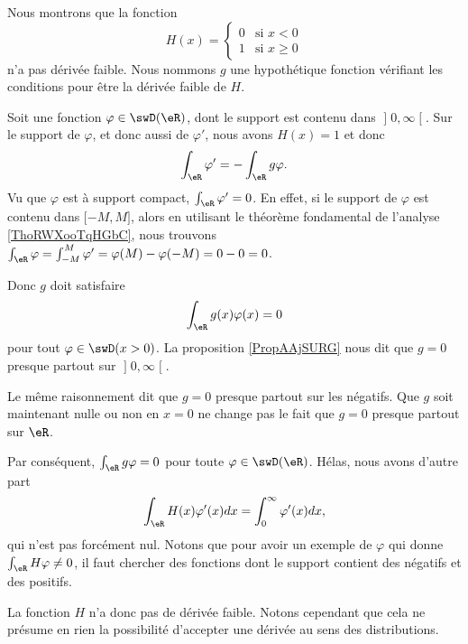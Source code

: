 \begin{example}     \label{EXooRVGHooTWOCtF}
	Nous montrons que la fonction
	\begin{equation}
		H(x)=\begin{cases}
			0 & \text{si } x<0     \\
			1 & \text{si } x\geq 0
		\end{cases}
	\end{equation}
	n'a pas dérivée faible. Nous nommons \( g\) une hypothétique fonction vérifiant les conditions pour être la dérivée faible de \( H\).

	Soit une fonction \( \varphi\in\swD(\eR)\), dont le support est contenu dans \( \mathopen] 0 , \infty \mathclose[\). Sur le support de \( \varphi\), et donc aussi de \( \varphi'\), nous avons \( H(x)=1\) et donc
		\begin{equation}
			\int_{\eR}\varphi'=-\int_{\eR}g\varphi.
		\end{equation}
		Vu que \( \varphi\) est à support compact, \( \int_{\eR}\varphi'=0\). En effet, si le support de \( \varphi\) est contenu dans \( \mathopen[ -M , M \mathclose]\), alors en utilisant le théorème fondamental de l'analyse \ref{ThoRWXooTqHGbC}, nous trouvons \( \int_{\eR}\varphi=\int_{-M}^M\varphi'=\varphi(M)-\varphi(-M)=0-0=0\).

		Donc \( g\) doit satisfaire
		\begin{equation}
			\int_{\eR}g(x)\varphi(x)=0
		\end{equation}
		pour tout \( \varphi\in\swD(x>0)\). La proposition \ref{PropAAjSURG} nous dit que \( g=0\) presque partout sur \( \mathopen] 0 , \infty \mathclose[\).

	Le même raisonnement dit que \( g=0\) presque partout sur les négatifs. Que \( g\) soit maintenant nulle ou non en \( x=0\) ne change pas le fait que \( g=0\) presque partout sur \( \eR\).

	Par conséquent, \( \int_{\eR}g\varphi=0\) pour toute \( \varphi\in \swD(\eR)\). Hélas, nous avons d'autre part
	\begin{equation}
		\int_{\eR}H(x)\varphi'(x)dx=\int_0^{\infty}\varphi'(x)dx,
	\end{equation}
	qui n'est pas forcément nul. Notons que pour avoir un exemple de \( \varphi\) qui donne \( \int_{\eR}H\varphi\neq 0\), il faut chercher des fonctions dont le support contient des négatifs et des positifs.

	La fonction \( H\) n'a donc pas de dérivée faible. Notons cependant que cela ne présume en rien la possibilité d'accepter une dérivée au sens des distributions.
\end{example}


